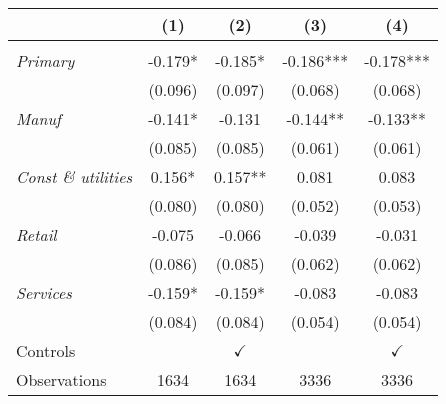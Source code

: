 

\begin{tabular}{lcccc}

\toprule


& (1) & (2) & (3) & (4)   \\

\midrule

\multicolumn{1}{l}{} &  \multicolumn{4}{c}{ } \\

\textit{Primary} 	&  -0.179*   &
						   -0.185*   &
						   -0.186***   &
						   -0.178***   \\
						   
						&   \tiny{(0.096)}   &
						    \tiny{(0.097)}   &
						    \tiny{(0.068)}   &
						    \tiny{(0.068)}   \\


\textit{Manuf} 	&  -0.141*   &
						   -0.131   &
						   -0.144**   &
						   -0.133**   \\
						   
						&   \tiny{(0.085)}   &
						    \tiny{(0.085)}   &
						    \tiny{(0.061)}   &
						    \tiny{(0.061)}   \\

\textit{Const \& utilities} 	&  0.156*   &
						   0.157**   &
						   0.081   &
						   0.083   \\
						   
						&   \tiny{(0.080)}   &
						    \tiny{(0.080)}   &
						    \tiny{(0.052)}   &
						    \tiny{(0.053)}   \\

\textit{Retail} 	&  -0.075   &
						   -0.066   &
						   -0.039   &
						   -0.031   \\
						   
						&   \tiny{(0.086)}   &
						    \tiny{(0.085)}   &
						    \tiny{(0.062)}   &
						    \tiny{(0.062)}   \\

\textit{Services} 	&  -0.159*   &
						   -0.159*   &
						   -0.083   &
						   -0.083   \\
						   
						&   \tiny{(0.084)}   &
						    \tiny{(0.084)}   &
						    \tiny{(0.054)}   &
						    \tiny{(0.054)}   \\


\midrule

{Controls}    		    			&	     
									& $\checkmark$  
									&
									& $\checkmark$  \\


Observations					&	1634 &
						    	1634 &
						    	3336 &
								3336 \\
\bottomrule

\end{tabular}%

